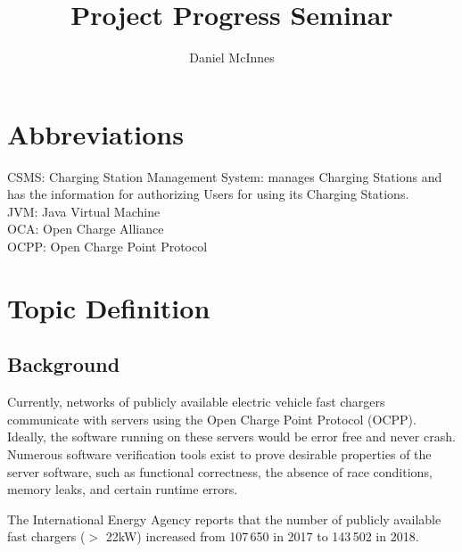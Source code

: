 \documentclass[11pt]{article}
\title{\textbf{Project Progress Seminar}}
\author{Daniel McInnes}
\date{}
\begin{document}
\maketitle

\section{Abbreviations}
CSMS: Charging Station Management System: manages Charging Stations and has the information for authorizing
Users for using its Charging Stations.\\
JVM: Java Virtual Machine \\
OCA: Open Charge Alliance\\
OCPP: Open Charge Point Protocol\\
\section{Topic Definition}

\subsection{Background}
Currently, networks of publicly available electric vehicle fast chargers communicate with servers using the Open Charge Point Protocol (OCPP). Ideally, the software running on these servers would be error free and never crash. Numerous software verification tools exist to prove desirable properties of the server software, such as functional correctness, the absence of race conditions, memory leaks, and certain runtime errors. 

The International Energy Agency \cite{GlobalEVOutlook2019} reports that the number of publicly available fast chargers ($>$ 22kW) increased from 107\,650 in 2017 to 143\,502 in 2018.\\

\end{document}
